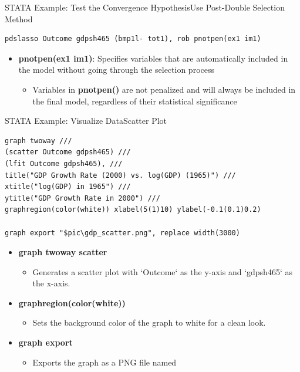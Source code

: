 \documentclass[dvipsnames,hyperref={pdfpagelabels=false}]{beamer}
\begin{document}
\begin{frame}[fragile]{STATA Example: Test the Convergence Hypothesis}{Use Post-Double Selection Method}
\begin{lstlisting}
pdslasso Outcome gdpsh465 (bmp1l- tot1), rob pnotpen(ex1 im1)
\end{lstlisting}
	
	\begin{itemize}    
		\item \textbf{pnotpen(ex1 im1)}: Specifies variables that are automatically included in the model without going through the selection process
		\vspace{0.2cm}
			\begin{itemize}
		\item Variables in \textbf{pnotpen()} are not penalized and will always be included in the final model, regardless of their statistical significance
			\end{itemize}
	\end{itemize}
	
\end{frame}








\begin{frame}[fragile]{STATA Example: Visualize Data}{Scatter Plot}
\begin{lstlisting}
graph twoway ///
(scatter Outcome gdpsh465) ///
(lfit Outcome gdpsh465), ///
title("GDP Growth Rate (2000) vs. log(GDP) (1965)") ///
xtitle("log(GDP) in 1965") ///
ytitle("GDP Growth Rate in 2000") ///
graphregion(color(white)) xlabel(5(1)10) ylabel(-0.1(0.1)0.2)

graph export "$pic\gdp_scatter.png", replace width(3000)
\end{lstlisting}
	\begin{itemize}	
 \item \textbf{graph twoway scatter}
\begin{itemize}
	\item Generates a scatter plot with `Outcome` as the y-axis and `gdpsh465` as the x-axis.
\end{itemize}
	\vspace{0.2cm}
\item \textbf{graphregion(color(white))} 
\begin{itemize}
	\item Sets the background color of the graph to white for a clean look.
\end{itemize}
	\vspace{0.2cm}
\item \textbf{graph export} 
\begin{itemize}
	\item Exports the graph as a PNG file named
\end{itemize}
		
		
	\end{itemize}
	
\end{frame}
\end{document}
